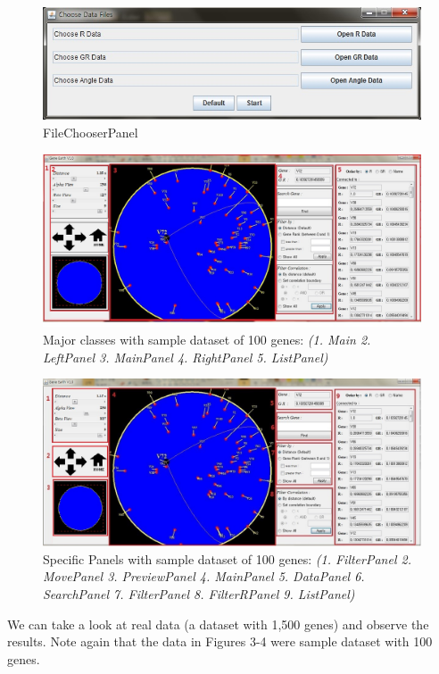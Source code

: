 \documentclass[]{article}
\begin{document}
\begin{figure}[h!]
	\centering
	\includegraphics[scale=0.48]{FileChooser}
	\caption{FileChooserPanel}
\end{figure}

\begin{figure}[h!]
	\centering
	\includegraphics[scale=0.48]{ProgramPanels}
	\caption{Major classes with sample dataset of 100 genes: \textit{(1. Main 2. LeftPanel 3. MainPanel 4. RightPanel 5. ListPanel)}}
\end{figure}

\begin{figure}[h!]
	\centering
	\includegraphics[scale=0.48]{ProgramPanelsDetail}
	\caption{Specific Panels with sample dataset of 100 genes: \textit{(1. FilterPanel 2. MovePanel 3. PreviewPanel 4. MainPanel 5. DataPanel 6. SearchPanel 7. FilterPanel 8. FilterRPanel 9. ListPanel)}}
\end{figure}


We can take a look at real data (a dataset with 1,500 genes) and observe the results.   Note again that the data in Figures 3-4 were sample dataset with 100 genes.
\end{document}
